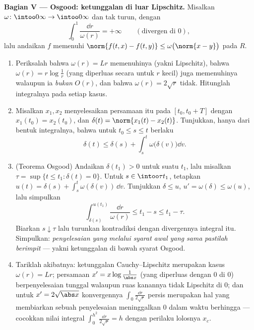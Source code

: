 \begin{problem}[{Soal akhir pekan --- keberadaan penyelesaian
$x' = f(t, x)$ tanpa Lipschitz}]
\medskip
\noindent\textbf{Bagian V --- Osgood: ketunggalan di luar
Lipschitz.} Misalkan $\omega\colon\intoo0\infty\to\intoo0\infty$
 dan tak turun, dengan
\[
\int_0^1\frac{\dd r}{\omega(r)} = +\infty
\qquad(\text{divergen di } 0),
\]
lalu andaikan $f$ memenuhi $\norm{f(t, x) - f(t, y)} \leq
\omega\bigl(\norm{x - y}\bigr)$ pada $R$.
\begin{enumerate}[resume]
  \item Periksalah bahwa $\omega(r) = Lr$ memenuhinya (yakni Lipschitz), bahwa
        $\omega(r) = r\log\frac1r$ (yang diperluas secara  untuk
        $r$ kecil) juga memenuhinya walaupun ia \emph{bukan} $O(r)$,
        dan bahwa $\omega(r) = 2\sqrt r$ tidak. Hitunglah
        integralnya pada setiap kasus.
  \item Misalkan $x_1, x_2$ menyelesaikan persamaan itu pada $[t_0, t_0 + T]$
        dengan $x_1(t_0) = x_2(t_0)$, dan $\delta(t) =
        \norm{x_1(t) - x_2(t)}$. Tunjukkan, hanya dari bentuk integralnya,
        bahwa untuk $t_0 \leq s \leq t$ berlaku
        \[
        \delta(t) \leq \delta(s) +
        \int_s^t\omega\bigl(\delta(v)\bigr)\dd v .
        \]
  \item (Teorema Osgood) Andaikan $\delta(t_1) > 0$ untuk suatu
        $t_1$, lalu misalkan $\tau = \sup\{t \leq t_1 : \delta(t) =
        0\}$. Untuk $s \in \intoo\tau{t_1}$, tetapkan $u(t) = \delta(s)
        + \int_s^t\omega(\delta(v))\,\dd v$. Tunjukkan $\delta \leq
        u$, $u' = \omega(\delta) \leq \omega(u)$, lalu simpulkan
        \[
        \int_{\delta(s)}^{u(t_1)}\frac{\dd r}{\omega(r)}
        \leq t_1 - s \leq t_1 - \tau .
        \]
        Biarkan $s \downarrow \tau$ lalu turunkan kontradiksi dengan
        divergennya integral itu. Simpulkan:
        \emph{penyelesaian yang melalui syarat awal yang sama pastilah
        berimpit} --- yakni ketunggalan di bawah syarat Osgood.
  \item Tariklah akibatnya: ketunggalan Cauchy--Lipschitz merupakan
        kasus $\omega(r) = Lr$; persamaan $x' =
        x\log\frac1{\abs x}$ (yang diperluas dengan $0$ di $0$) berpenyelesaian
        tunggal walaupun ruas kanannya tidak Lipschitz di
        $0$; dan untuk $x' = 2\sqrt{\abs x}$ konvergennya
        $\int_0\frac{\dd r}{2\sqrt r}$ persis merupakan hal yang membiarkan sebuah
        penyelesaian meninggalkan $0$ dalam waktu berhingga --- cocokkan nilai
        integral $\int_0^{h^2}\frac{\dd r}{2\sqrt r} = h$
        dengan perilaku lolosnya $x_c$.
\end{enumerate}


\end{problem}

